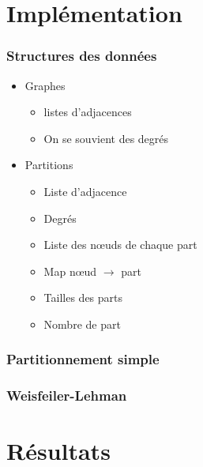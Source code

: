 \documentclass{beamer}
\begin{document}
\section{Implémentation}

    \begin{frame}
      \frametitle{Structures des données}
      \begin{itemize}
        \item<1->
          Graphes
          \begin{itemize}
            \item listes d'adjacences
            \item On se souvient des degrés
          \end{itemize}
        \item<2->
          Partitions
          \begin{itemize}
            \item<2-> Liste d'adjacence
            \item<2-> Degrés
            \item<3-> Liste des nœuds de chaque part
            \item<3-> Map nœud $\to$ part
            \item<3-> Tailles des parts
            \item<3-> Nombre de part
          \end{itemize}
      \end{itemize}
    \end{frame}

    \begin{frame}
      \frametitle{Partitionnement simple}
    \end{frame}

    \begin{frame}
      \frametitle{Weisfeiler-Lehman}
    \end{frame}

\section{Résultats}
\end{document}
